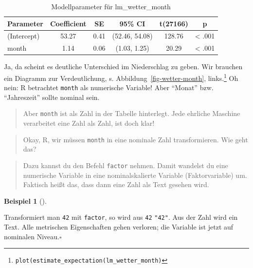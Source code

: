 \documentclass[
  a4paper,
]{scrbook}
\theoremstyle{definition}
\newtheorem{example}{Beispiel}[chapter]
\theoremstyle{definition}
\theoremstyle{definition}
\theoremstyle{remark}
\begin{document}
\begin{longtable}[]{@{}lccccc@{}}

\caption{\label{tbl-lm_wetter-month}Modellparameter für
lm\_wetter\_month}

\tabularnewline

\toprule\noalign{}
Parameter & Coefficient & SE & 95\% CI & t(27166) & p \\
\midrule\noalign{}
\endhead
\bottomrule\noalign{}
\endlastfoot
(Intercept) & 53.27 & 0.41 & (52.46, 54.08) & 128.76 & \textless{}
.001 \\
month & 1.14 & 0.06 & (1.03, 1.25) & 20.29 & \textless{} .001 \\

\end{longtable}

Ja, da scheint es deutliche Unterschied im Niederschlag zu geben. Wir
brauchen ein Diagramm zur Verdeutlichung, s.
Abbildung~\ref{fig-wetter-month}, links.\footnote{\texttt{plot(estimate\_expectation(lm\_wetter\_month)}}
Oh nein: R betrachtet \texttt{month} als numerische Variable! Aber
``Monat'' bzw. ``Jahreszeit'' sollte nominal sein.

\begin{quote}
{} Aber \texttt{month} ist als Zahl in der Tabelle
hinterlegt. Jede ehrliche Maschine verarbeitet eine Zahl als Zahl, ist
doch klar!
\end{quote}

\begin{quote}
{} Okay, R, wir müssen \texttt{month} in eine nominale Zahl
transformieren. Wie geht das?
\end{quote}

\begin{quote}
{} Dazu kannst du den Befehl \texttt{factor} nehmen. Damit
wandelst du eine numerische Variable in eine nominalskalierte Variable
(Faktorvariable) um. Faktisch heißt das, dass dann eine Zahl als Text
gesehen wird.
\end{quote}

\begin{example}[]\protect\hypertarget{exm-factor}{}\label{exm-factor}

Transformiert man \texttt{42} mit \texttt{factor}, so wird aus
\texttt{42} \texttt{"42"}. Aus der Zahl wird ein Text. Alle metrischen
Eigenschaften gehen verloren; die Variable ist jetzt auf nominalen
Niveau.\(\square\)

\end{example}
\end{document}

